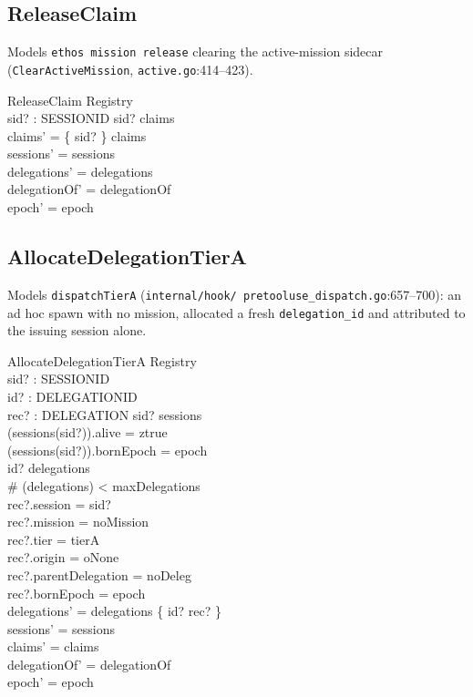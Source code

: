 \documentclass[a4paper,10pt,fleqn]{article}
\newcommand{\fpath}[1]{\texttt{#1}}
\newcommand{\field}[1]{\texttt{#1}}
\begin{document}
\subsection{ReleaseClaim}

Models \field{ethos mission release} clearing the active-mission
sidecar (\field{ClearActiveMission}, \fpath{active.go}:414--423).

\begin{schema}{ReleaseClaim}
\Delta Registry \\
sid? : SESSIONID
\where
sid? \in \dom claims \\
claims' = \{ sid? \} \ndres claims \\
sessions' = sessions \\
delegations' = delegations \\
delegationOf' = delegationOf \\
epoch' = epoch
\end{schema}

\subsection{AllocateDelegationTierA}

Models \field{dispatchTierA} (\fpath{internal/hook/
pretooluse\_dispatch.go}:657--700): an ad hoc spawn with no mission,
allocated a fresh \field{delegation\_id} and attributed to the issuing
session alone.

\begin{schema}{AllocateDelegationTierA}
\Delta Registry \\
sid? : SESSIONID \\
id? : DELEGATIONID \\
rec? : DELEGATION
\where
sid? \in \dom sessions \\
(sessions(sid?)).alive = ztrue \\
(sessions(sid?)).bornEpoch = epoch \\
id? \notin \dom delegations \\
\# (\dom delegations) < maxDelegations \\
rec?.session = sid? \\
rec?.mission = noMission \\
rec?.tier = tierA \\
rec?.origin = oNone \\
rec?.parentDelegation = noDeleg \\
rec?.bornEpoch = epoch \\
delegations' = delegations \oplus \{ id? \mapsto rec? \} \\
sessions' = sessions \\
claims' = claims \\
delegationOf' = delegationOf \\
epoch' = epoch
\end{schema}
\end{document}
